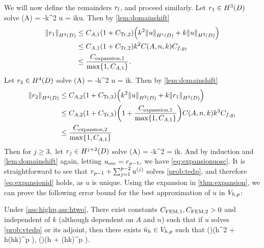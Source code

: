 We will now define the remainders $r_{l}$, and proceed similarly.
Let $\ro \in \HthD$ solve
\beqs
\grad \cdot \mleft(A\grad \ro\mright) = -k^2 u
\eeqs
\beqs
\dn \ro = iku.
\eeqs
Then by \cref{lem:domainshift}
\begin{align*}
\NHthD{\ro} &\leq \CAo\mleft(1+\CTrt\mright)\mleft(k^2\NHoD{u} + k\NHtD{u}\mright)\\
&\leq \CAo\mleft(1+\CTrt\mright)k^2\CAnk\Cfg\\
&\leq \frac{\Cefn{1}}{\max\set{1,\CAo}}.
\end{align*}
Let $\rt \in \HfD$ solve
\beqs
\grad \cdot \mleft(A\grad \rt\mright) = -k^2 u
\eeqs
\beqs
\dn \rt = ik\ro.
\eeqs
Then by \cref{lem:domainshift}
\begin{align*}
\NHfD{\rt} &\leq \CAt\mleft(1+\CTrth\mright)\mleft(k^2\NHtD{u} + k\NHthD{\ro}\mright)\\
&\leq \CAt\mleft(1+\CTrth\mright)\mleft(1 + \frac{\Cefn{1}}{\max\set{1,\CAo}}\mright)\CAnk k^3\Cfg\\
&\leq \frac{\Cefn{2}}{\max\set{1,\CAo}}
\end{align*}
Then for $j \geq 3,$ let $\rj \in \HjptD$ solve
\beqs
\grad \cdot \mleft(A\grad \rt\mright) = -k^2 \rjmt
\eeqs
\beqs
\dn \rj = ik\rjmo.
\eeqs
And by induction and \cref{lem:domainshift} again, letting $u_{\mathrm{osc}} = r_{p-1},$ we have \cref{eq:expansionuosc}. It is straightforward to see that $r_{p-1} + \sum_{j=1}^{p-2} u^{(j)}$ solves \cref{prob:tedp}, and therefore \cref{eq:expansionid} holds, as $u$ is unique.
\epf
Using the expansion in \cref{thm:expansion}, we can prove the following error bound for the best approximation of $u$ in $V_{h,p}$:


\label{lem:bestapprox}
Under \cref{ass:highp,ass:htwo}, There exist constants $C_{\mathrm{FEM},1}, C_{\mathrm{FEM},2} > 0$ and independent of $k$ (although dependent on $A$ and $n$) such that if $u$ solves \cref{prob:vtedp} or its adjoint, then there exists $\hat{u}_{h} \in V_{h,p}$ such that
\beq\label{eq:bestapproxL2}
 \leq {}\mleft(\mright)\mleft(\CFEMo  h^2 + \CFEMt \CAnk h\mleft(hk\mright)^p \mright)\Cfg,
\eeq
\beq\label{eq:bestapproxW}
 \mleft(\mright)\mleft(\CFEMo  h + \CFEMt \CAnk \mleft(hk\mright)^p \mright)\Cfg.
\eeq
\ele

